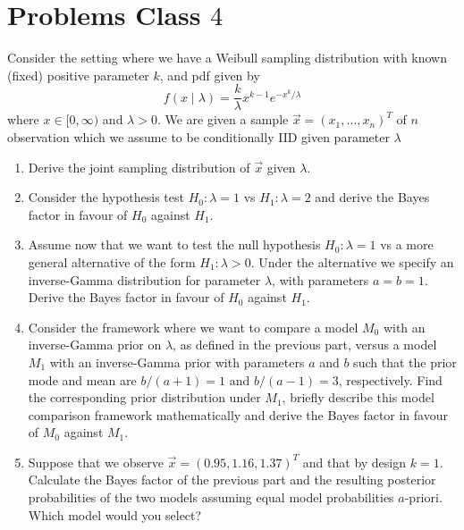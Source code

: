 \documentclass[10pt, a4paper]{article}
\begin{document}
\newpage

\section{Problems Class \texorpdfstring{$4$}{}}

\begin{problem}
    Consider the setting where we have a Weibull sampling distribution with known
    (fixed)
    positive parameter $k$,
    and pdf given by
    \[
    f(x \mid \lambda) = \frac{k}{\lambda}x ^ {k - 1}e ^ {-x ^ k / \lambda}
    \]
    where $x \in [0, \infty)$ and $\lambda > 0$.
    We are given a sample $\vec{x} = (x_1, \dotsc, x_n) ^ T$ of $n$ observation which we assume to be conditionally IID given parameter $\lambda$

    \begin{enumerate}[label = (\arabic*)]
        \item Derive the joint sampling distribution of $\vec{x}$ given $\lambda$.

        \item Consider the hypothesis test $H_0 : \lambda = 1$ vs $H_1 : \lambda = 2$ and derive the Bayes factor in favour of $H_0$ against $H_1$.

        \item Assume now that we want to test the null hypothesis $H_0 : \lambda = 1$ vs a more general alternative of the form $H_1 : \lambda > 0$.
        Under the alternative we specify an inverse-Gamma distribution for parameter $\lambda$,
        with parameters $a = b = 1$.
        Derive the Bayes factor in favour of $H_0$ against $H_1$.

        \item Consider the framework where we want to compare a model $M_0$ with an inverse-Gamma prior on $\lambda$,
        as defined in the previous part,
        versus a model $M_1$ with an inverse-Gamma prior with parameters $a$ and $b$ such that the prior mode and mean are $b / (a + 1) = 1$ and $b / (a - 1) = 3$,
        respectively.
        Find the corresponding prior distribution under $M_1$,
        briefly describe this model comparison framework mathematically and derive the Bayes factor in favour of $M_0$ against $M_1$.

        \item Suppose that we observe $\vec{x} = (0.95, 1.16, 1.37) ^ T$ and that by design $k = 1$.
        Calculate the Bayes factor of the previous part and the resulting posterior probabilities of the two models assuming equal model probabilities $a$-priori.
        Which model would you select?
    \end{enumerate}


\end{problem}
\end{document}
